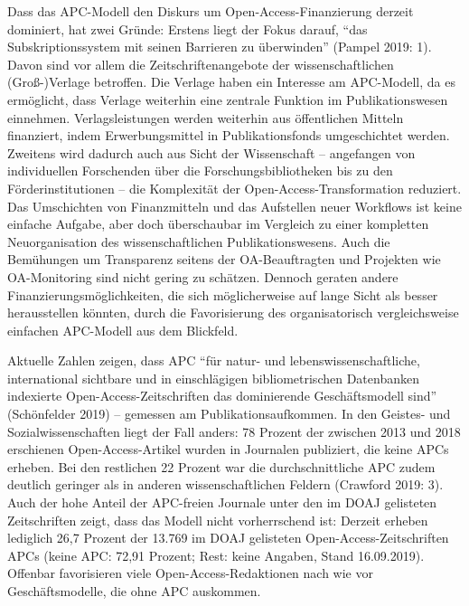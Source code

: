 \documentclass[a4paper,
fontsize=11pt,
oneside,
numbers=noperiodatend,
parskip=half-,
bibliography=totoc,
final
]{scrartcl}
\begin{document}
Dass das APC-Modell den Diskurs um Open-Access-Finanzierung derzeit
dominiert, hat zwei Gründe: Erstens liegt der Fokus darauf, \enquote{das
Subskriptionssystem mit seinen Barrieren zu überwinden} (Pampel 2019:
1). Davon sind vor allem die Zeitschriftenangebote der
wissenschaftlichen (Groß-)Verlage betroffen. Die Verlage haben ein
Interesse am APC-Modell, da es ermöglicht, dass Verlage weiterhin eine
zentrale Funktion im Publikationswesen einnehmen. Verlagsleistungen
werden weiterhin aus öffentlichen Mitteln finanziert, indem
Erwerbungsmittel in Publikationsfonds umgeschichtet werden. Zweitens
wird dadurch auch aus Sicht der Wissenschaft -- angefangen von
individuellen Forschenden über die Forschungsbibliotheken bis zu den
Förderinstitutionen -- die Komplexität der Open-Access-Transformation
reduziert. Das Umschichten von Finanzmitteln und das Aufstellen neuer
Workflows ist keine einfache Aufgabe, aber doch überschaubar im
Vergleich zu einer kompletten Neuorganisation des wissenschaftlichen
Publikationswesens. Auch die Bemühungen um Transparenz seitens der
OA-Beauftragten und Projekten wie OA-Monitoring sind nicht gering zu
schätzen. Dennoch geraten andere Finanzierungsmöglichkeiten, die sich
möglicherweise auf lange Sicht als besser herausstellen könnten, durch
die Favorisierung des organisatorisch vergleichsweise einfachen
APC-Modell aus dem Blickfeld.

Aktuelle Zahlen zeigen, dass APC \enquote{für natur- und
lebenswissenschaftliche, international sichtbare und in einschlägigen
bibliometrischen Datenbanken indexierte Open-Access-Zeitschriften das
dominierende Geschäftsmodell sind} (Schönfelder 2019) -- gemessen am
Publikationsaufkommen. In den Geistes- und Sozialwissenschaften liegt
der Fall anders: 78 Prozent der zwischen 2013 und 2018 erschienen
Open-Access-Artikel wurden in Journalen publiziert, die keine APCs
erheben. Bei den restlichen 22 Prozent war die durchschnittliche APC
zudem deutlich geringer als in anderen wissenschaftlichen Feldern
(Crawford 2019: 3). Auch der hohe Anteil der APC-freien Journale unter
den im DOAJ gelisteten Zeitschriften zeigt, dass das Modell nicht
vorherrschend ist: Derzeit erheben lediglich 26,7 Prozent der 13.769 im
DOAJ gelisteten Open-Access-Zeitschriften APCs (keine APC: 72,91
Prozent; Rest: keine Angaben, Stand 16.09.2019). Offenbar favorisieren
viele Open-Access-Redaktionen nach wie vor Geschäftsmodelle, die ohne
APC auskommen.
\end{document}
